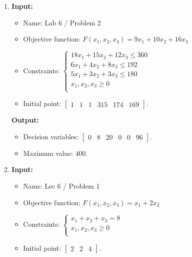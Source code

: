 \documentclass{article}
\begin{document}
\begin{enumerate}[label={(\arabic*)}, itemsep=0.25in]
    \item \textbf{Input:}
          \begin{itemize}
              \item Name: Lab 6 / Problem 2
              \item Objective function: \(F(x_1, x_2, x_3) = 9 x_1 + 10 x_2 + 16 x_3\)
              \item Constraints: \(\begin{cases}
                        18 x_1 + 15 x_2 + 12 x_3 \le 360 \\
                        6 x_1 + 4 x_2 + 8 x_3 \le 192    \\
                        5 x_1 + 3 x_2 + 3 x_3 \le 180    \\
                        x_1, x_2, x_3 \ge 0              \\
                    \end{cases}\)
          \end{itemize}
          \begin{itemize}
              \item Initial point: \(\begin{bmatrix} 1 & 1 & 1 & 315 & 174 & 169 \end{bmatrix}\).
          \end{itemize}

          \textbf{Output:}
          \begin{itemize}
              \item Decision variables: \(\begin{bmatrix} 0 & 8 & 20 & 0 & 0 & 96 \end{bmatrix}\).
              \item Maximum value: \(400\).
          \end{itemize}

    \item \textbf{Input:}
          \begin{itemize}
              \item Name: Lec 6 / Problem 1
              \item Objective function: \(F(x_1, x_2, x_3) =  x_1 + 2 x_2\)
              \item Constraints: \(\begin{cases}
                        x_1 + x_2 + x_3 = 8 \\
                        x_1, x_2, x_3 \ge 0 \\
                    \end{cases}\)
              \item Initial point: \(\begin{bmatrix} 2 & 2 & 4 \end{bmatrix}\).
          \end{itemize}


\end{enumerate}
\end{document}
